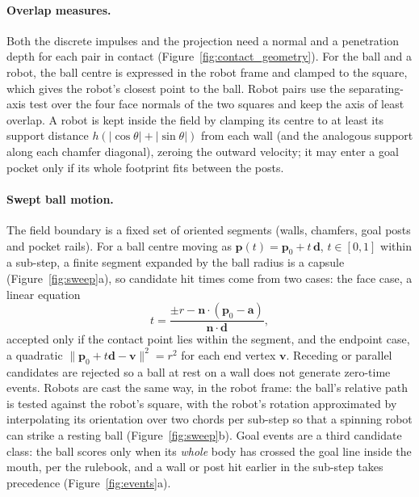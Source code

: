 \paragraph{Overlap measures.}
Both the discrete impulses and the projection need a normal and a penetration depth for
each pair in contact (Figure~\ref{fig:contact_geometry}).  For the ball and a robot, the ball
centre is expressed in the robot frame and clamped to the square, which gives the robot's
closest point to the ball.  Robot pairs use the separating-axis test over the four face
normals of the two squares and keep the axis of least overlap.  A robot is kept inside the
field by clamping its centre to at least its support distance $h(\lvert\cos\theta\rvert+\lvert\sin\theta\rvert)$
from each wall (and the analogous support along each chamfer diagonal), zeroing the outward
velocity; it may enter a goal pocket only if its whole footprint fits between the posts.



\paragraph{Swept ball motion.}
The field boundary is a fixed set of oriented segments (walls, chamfers, goal posts
and pocket rails).  For a ball centre moving as $\mathbf p(t) = \mathbf p_0 + t\,\mathbf d$,
$t\in[0,1]$ within a sub-step, a finite segment expanded by the ball radius is a
capsule (Figure~\ref{fig:sweep}a), so candidate hit times come from two cases: the face case, a linear equation
\begin{equation}
    t = \frac{\pm r - \mathbf n\cdot(\mathbf p_0 - \mathbf a)}{\mathbf n\cdot\mathbf d},
\end{equation}
accepted only if the contact point lies within the segment, and the endpoint case, a
quadratic $\lVert \mathbf p_0 + t\mathbf d - \mathbf v\rVert^2 = r^2$ for each end vertex
$\mathbf v$.  Receding or parallel candidates are rejected so a ball at rest on a wall does
not generate zero-time events.  Robots are cast the same way, in the robot frame: the
ball's relative path is tested against the robot's square, with the robot's rotation
approximated by interpolating its orientation over two chords per sub-step so that a
spinning robot can strike a resting ball (Figure~\ref{fig:sweep}b).  Goal events are a third candidate class: the
ball scores only when its \emph{whole} body has crossed the goal line inside the mouth, per
the rulebook, and a wall or post hit earlier in the sub-step takes precedence (Figure~\ref{fig:events}a).

